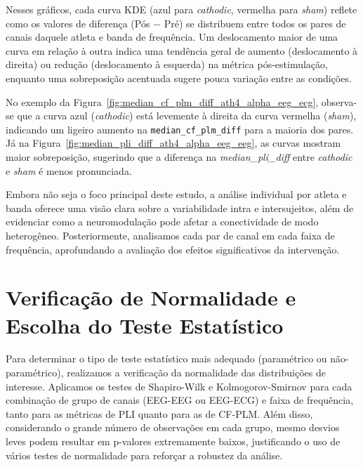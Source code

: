 Nesses gráficos, cada curva KDE (azul para \textit{cathodic}, vermelha para \textit{sham}) reflete como os valores de diferença (Pós $-$ Pré) se distribuem entre todos os pares de canais daquele atleta e banda de frequência. Um deslocamento maior de uma curva em relação à outra indica uma tendência geral de aumento (deslocamento à direita) ou redução (deslocamento à esquerda) na métrica pós-estimulação, enquanto uma sobreposição acentuada sugere pouca variação entre as condições. 

No exemplo da Figura~\ref{fig:median_cf_plm_diff_ath4_alpha_eeg_ecg}, observa-se que a curva azul (\textit{cathodic}) está levemente à direita da curva vermelha (\textit{sham}), indicando um ligeiro aumento na \texttt{median\_cf\_plm\_diff} para a maioria dos pares. Já na Figura~\ref{fig:median_pli_diff_ath4_alpha_eeg_eeg}, as curvas mostram maior sobreposição, sugerindo que a diferença na \textit{median\_pli\_diff} entre \textit{cathodic} e \textit{sham} é menos pronunciada.

Embora não seja o foco principal deste estudo, a análise individual por atleta e banda oferece uma visão clara sobre a variabilidade intra e intersujeitos, além de evidenciar como a neuromodulação pode afetar a conectividade de modo heterogêneo. Posteriormente, analisamos cada par de canal em cada faixa de frequência, aprofundando a avaliação dos efeitos significativos da intervenção.

\section{Verificação de Normalidade e Escolha do Teste Estatístico}
Para determinar o tipo de teste estatístico mais adequado (paramétrico ou não-paramétrico), realizamos a verificação da normalidade das distribuições de interesse. Aplicamos os testes de Shapiro-Wilk e Kolmogorov-Smirnov para cada combinação de grupo de canais (EEG-EEG ou EEG-ECG) e faixa de frequência, tanto para as métricas de PLI quanto para as de CF-PLM. 
Além disso, considerando o grande número de observações em cada grupo, mesmo desvios leves podem resultar em p-valores extremamente baixos, justificando o uso de vários testes de normalidade para reforçar a robustez da análise.

